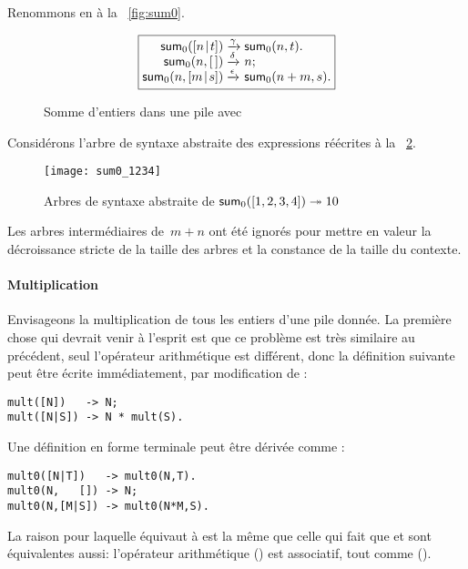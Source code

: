 Renommons  en  à la
\fig~\vref{fig:sum0}.
\begin{figure}[b]
\begin{equation*}
\boxed{%
\begin{array}{@{}r@{\;}l@{\;}l@{}}
\fun{sum}_0(\cons{n}{t}) & \xrightarrow{\smash{\gamma}}
                         & \fun{sum}_0(n,t).\\
      \fun{sum}_0(n,\el) & \xrightarrow{\smash{\delta}} & n;\\
\fun{sum}_0(n,\cons{m}{s}) & \xrightarrow{\smash{\epsilon}}
                           & \fun{sum}_0(n+m,s).
\end{array}}
\end{equation*}
\caption{Somme d'entiers dans une pile avec }
\label{fig:sum0}
\end{figure}
Considérons l'arbre de syntaxe abstraite des expressions réécrites à
la \fig~\ref{fig:sum0_1234}.
\begin{figure}
\centering
\texttt{[image: sum0\_1234]}
\caption{Arbres de syntaxe abstraite de \(\textsf{sum}_0([1,2,3,4])
  \twoheadrightarrow 10\)}
\label{fig:sum0_1234}
\end{figure}
Les arbres intermédiaires de~\(m+n\) ont été ignorés pour mettre en
valeur la décroissance stricte de la taille des arbres et la constance
de la taille du contexte.

\paragraph{Multiplication}

Envisageons la multiplication de tous les entiers d'une pile
donnée. La première chose qui devrait venir à l'esprit est que ce
problème est très similaire au précédent, seul l'opérateur
arithmétique est différent, donc la définition suivante peut être
écrite immédiatement, par modification de :
\begin{verbatim}
mult([N])   -> N;
mult([N|S]) -> N * mult(S).
\end{verbatim}
Une définition en forme terminale peut être dérivée comme
:
\begin{verbatim}
mult0([N|T])   -> mult0(N,T).
mult0(N,   []) -> N;
mult0(N,[M|S]) -> mult0(N*M,S).
\end{verbatim}
La raison pour laquelle  équivaut à 
est la même que celle qui fait que  et 
sont équivalentes aussi: l'opérateur arithmétique (\erlcode{*}) est
associatif, tout comme (\erlcode{+}).


